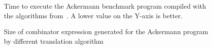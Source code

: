 \documentclass[conference]{IEEEtran}
\DeclareMathOperator{\strict}{strict}
\DeclareMathOperator{\lazy}{lazy}
\DeclareMathOperator{\lazyeta}{lazy_\eta}
\DeclareMathOperator{\linear}{linear}
\begin{document}
\begin{figure}
    
    \centering
    \caption{Time to execute the Ackermann benchmark program compiled with the algorithms from~\cite{kiselyov_lambda_2018}. A lower value on the Y-axis is better.}
    \label{fig:ack-bracket-vs-kiselyov}
\end{figure}

\begin{figure}
    \centering
    \caption{Size of combinator expression generated for the Ackermann program by different translation algorithm}
    \label{fig:ack-sizes}
\end{figure}

\FloatBarrier
\end{document}
